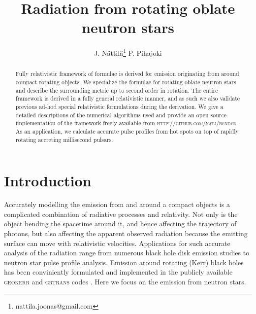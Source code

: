 \documentclass[iop, usenatbib]{emulateapj}
\begin{document}
\title{Radiation from rotating oblate neutron stars}

\author{J. N\"attil\"a\thanks{nattila.joonas@gmail.com}
  P. Pihajoki}

\affil{}


\begin{abstract}
Fully relativistic framework of formulae is derived for emission originating from around compact rotating objects.
We specialize the formulae for rotating oblate neutron stars and describe the surrounding metric up to second order in rotation.
The entire framework is derived in a fully general relativistic manner, and as such we also validate previous ad-hod special relativistic formulations during the derivation.
We give a detailed descriptions of the numerical algorithms used and provide an open source implementation of the framework freely available from \textsc{http://github.com/natj/bender}.
As an application, we calculate accurate pulse profiles from hot spots on top of rapidly rotating accreting millisecond pulsars.
\end{abstract}

\section{Introduction}
Accurately modelling the emission from and around a compact objects is a complicated combination of radiative processes and relativity.
Not only is the object bending the spacetime around it, and hence affecting the trajectory of photons, but also affecting the apparent observed radiation because the emitting surface can move with relativistic velocities.
Applications for such accurate analysis of the radiation range from numerous black hole disk emission studies to neutron star pulse profile analysis.
Emission around rotating (Kerr) black holes has been conviniently formulated and implemented in the publicly available \textsc{geokerr} and \textsc{grtrans} codes \citep{dexter2009, dexter2016}.
Here we focus on the emission from neutron stars. 
\end{document}
